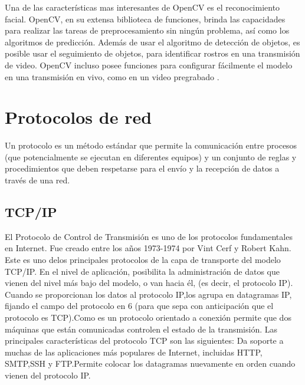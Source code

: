 Una de las características mas interesantes de OpenCV es el reconocimiento facial. OpenCV, en su extensa biblioteca de funciones, brinda las capacidades para realizar las tareas de preprocesamiento sin ningún problema, así como los algoritmos de predicción. Además de usar el algoritmo de detección de objetos, es posible usar el seguimiento de objetos, para identificar rostros en una transmisión de video. OpenCV incluso posee funciones para configurar fácilmente el modelo en una transmisión en vivo, como en un video pregrabado \cite{medium:opencv}. 


\section{Protocolos de red}
Un protocolo es un método estándar que permite la comunicación entre procesos (que potencialmente se ejecutan en diferentes equipos) y un conjunto de reglas y procedimientos que deben respetarse para el envío y la recepción de datos a través de una red.

\subsection{TCP/IP}
El Protocolo de Control de Transmisión es uno de los protocolos fundamentales en Internet. Fue creado entre los años 1973-1974 por Vint Cerf y Robert Kahn. Este es uno delos principales protocolos de la capa de transporte del modelo TCP/IP. En el nivel de aplicación, posibilita la administración de datos que vienen del nivel más bajo del modelo, o van hacia él, (es decir, el protocolo IP). Cuando se proporcionan los datos al protocolo IP,los agrupa en datagramas IP, fijando el campo del protocolo en 6 (para que sepa con anticipación que el protocolo es TCP).Como es un protocolo orientado a conexión permite que dos máquinas que están comunicadas controlen el estado de la transmisión. Las principales características del protocolo TCP son las siguientes: Da soporte a muchas de las aplicaciones más populares de Internet, incluidas HTTP, SMTP,SSH y FTP.Permite colocar los datagramas nuevamente en orden cuando vienen del protocolo IP.

 
